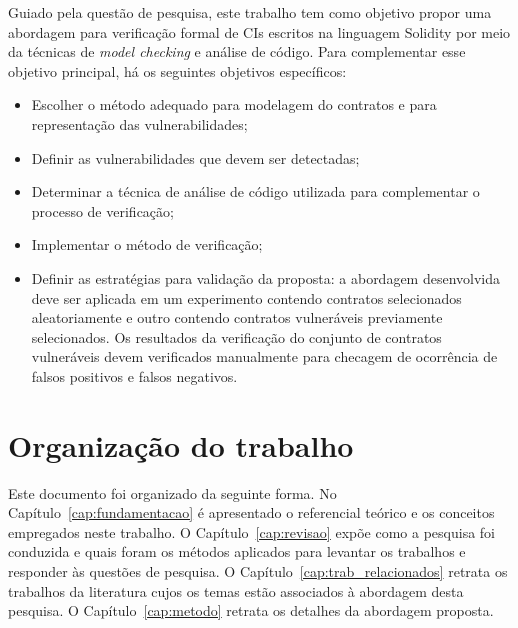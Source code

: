Guiado pela questão de pesquisa, este trabalho tem como objetivo propor uma abordagem para verificação formal de CIs escritos na linguagem Solidity por meio da técnicas de \textit{model checking} e análise de código. Para complementar esse objetivo principal, há os seguintes objetivos específicos:
\begin{itemize}
    \item Escolher o método adequado para modelagem do contratos e para representação das vulnerabilidades;
    \item Definir as vulnerabilidades que devem ser detectadas;
    \item Determinar a técnica de análise de código utilizada para complementar o processo de verificação;
    \item Implementar o método de verificação;
    \item Definir as estratégias para validação da proposta: a abordagem desenvolvida deve ser aplicada em um experimento contendo contratos selecionados aleatoriamente e outro contendo contratos vulneráveis previamente selecionados. Os resultados da verificação do conjunto de contratos vulneráveis devem verificados manualmente para checagem de ocorrência de falsos positivos e falsos negativos. 
\end{itemize}

\section{Organização do trabalho}

Este documento foi organizado da seguinte forma. No Capítulo~\ref{cap:fundamentacao} é apresentado o referencial teórico e os conceitos empregados neste trabalho. O Capítulo~\ref{cap:revisao} expõe como a pesquisa foi conduzida e quais foram os métodos aplicados para levantar os trabalhos e responder às questões de pesquisa. O Capítulo~\ref{cap:trab_relacionados} retrata os trabalhos da literatura cujos os temas estão associados à abordagem desta pesquisa. O Capítulo~\ref{cap:metodo} retrata os detalhes da abordagem proposta.


